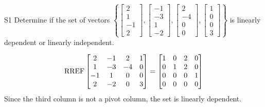 \begin{problem}{S1}
Determine if the set of vectors \(\left\{ \begin{bmatrix} 2 \\ 1 \\ -1 \\ 2 \end{bmatrix}, \begin{bmatrix} -1 \\ -3 \\ 1 \\ -2 \end{bmatrix}, \begin{bmatrix} 2 \\ -4 \\ 0 \\ 0 \end{bmatrix}, \begin{bmatrix} 1 \\ 0 \\ 0 \\ 3 \end{bmatrix} \right\} \) is linearly dependent or linearly independent.
\end{problem}
\begin{solution}
\[ \operatorname{RREF} \begin{bmatrix} 2 & -1 & 2  & 1\\ 1 & -3 & -4 & 0 \\ -1 & 1 & 0 & 0 \\ 2 & -2 & 0 & 3\end{bmatrix} = \begin{bmatrix} 1 & 0 & 2  & 0 \\ 0 & 1 & 2  & 0 \\ 0 & 0 & 0 & 1\\ 0 & 0 & 0 & 0 \end{bmatrix} \]
Since the third column is not a pivot column, the set is linearly dependent.
\end{solution}
